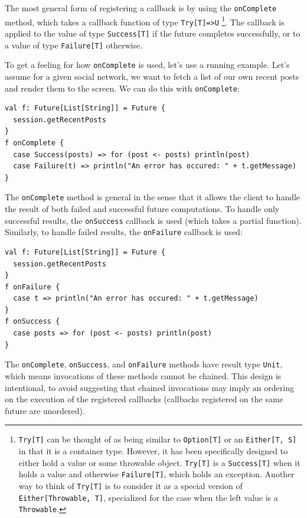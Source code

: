The most general form of registering a callback is by using the
\verb|onComplete| method, which takes a callback function of type
\verb|Try[T]=>U| \footnote{\texttt{Try[T]} can be thought of as being similar to
\texttt{Option[T]} or an \texttt{Either[T, S]} in that it is a container type.
However, it has been specifically designed to either hold a value or some
throwable object. \texttt{Try[T]} is a \texttt{Success[T]} when it holds a value
and otherwise \texttt{Failure[T]}, which holds an exception. Another way to
think of \texttt{Try[T]} is to consider it as a special version of
\texttt{Either[Throwable, T]}, specialized for the case when the left value is a
\texttt{Throwable}. }. The callback is applied to the value of type
\verb|Success[T]| if the future completes successfully, or to a value of type
\verb|Failure[T]| otherwise.

To get a feeling for how \verb|onComplete| is used, let's use a running example.
Let's assume for a given social network, we want to fetch a list of our own
recent posts and render them to the screen. We can do this with
\verb|onComplete|:

\begin{verbatim}
val f: Future[List[String]] = Future {
  session.getRecentPosts
}
f onComplete {
  case Success(posts) => for (post <- posts) println(post)
  case Failure(t) => println("An error has occured: " + t.getMessage)
}
\end{verbatim}

The \verb|onComplete| method is general in the sense that it allows the client
to handle the result of both failed and successful future computations. To
handle only successful results, the \verb|onSuccess| callback is used (which
takes a partial function). Similarly, to handle failed results, the
\verb|onFailure| callback is used:

\begin{verbatim}
val f: Future[List[String]] = Future {
  session.getRecentPosts
}
f onFailure {
  case t => println("An error has occured: " + t.getMessage)
}
f onSuccess {
  case posts => for (post <- posts) println(post)
}
\end{verbatim}

The \verb|onComplete|, \verb|onSuccess|, and \verb|onFailure| methods have
result type \verb|Unit|, which means invocations of these methods cannot be
chained. This design is intentional, to avoid suggesting that chained
invocations may imply an ordering on the execution of the registered callbacks
(callbacks registered on the same future are unordered).

